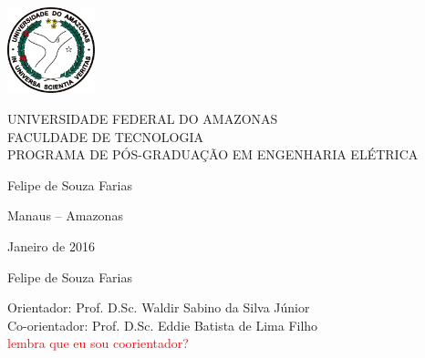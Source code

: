 \begin{center}
\includegraphics[bb=0 0 646 638,height=2.5cm]{ufam.png}

\textsf{\large%
UNIVERSIDADE FEDERAL DO AMAZONAS\\
FACULDADE DE TECNOLOGIA\\
PROGRAMA DE P\'OS-GRADUA\c{C}\~AO EM ENGENHARIA ELÉTRICA}

\vspace*{4cm}
\tittese

\vspace*{4cm}


{\large Felipe de Souza Farias}


\vspace*{3cm}

Manaus -- Amazonas

Janeiro de 2016

\end{center}





\begin{center}
{\large Felipe de Souza Farias}




\vspace*{4cm}
\tittese
\vspace*{2cm}
\descrtese
\vspace*{2cm}


Orientador: Prof. D.Sc. Waldir Sabino da Silva Júnior\\
Co-orientador: Prof. D.Sc. Eddie Batista de Lima Filho\\

\textcolor{red}{lembra que eu sou coorientador?}



\end{center}

